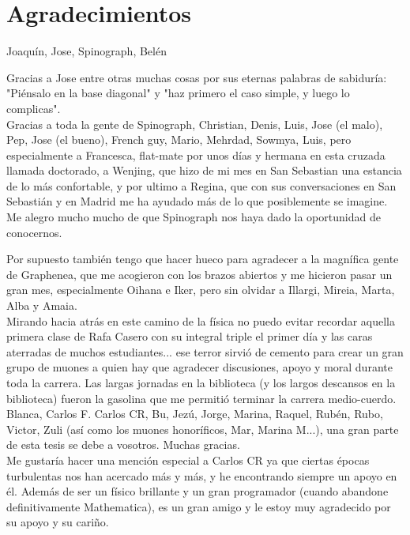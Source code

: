\chapter*{Agradecimientos}
Joaquín, Jose, Spinograph, Belén %


Gracias a Jose entre otras muchas cosas por sus eternas palabras de sabiduría: "Piénsalo en la base diagonal" y "haz primero el caso simple, y luego lo complicas".\\

Gracias a toda la gente de Spinograph, Christian, Denis, Luis, Jose (el malo), Pep, Jose (el bueno), French guy, Mario, Mehrdad, Sowmya, Luis, pero especialmente a Francesca, flat-mate por unos días y hermana en esta cruzada llamada doctorado, a Wenjing, que hizo de mi mes en San Sebastian una estancia de lo más confortable, y por ultimo a Regina, que con sus conversaciones en San Sebastián y en Madrid me ha ayudado más de lo que posiblemente se imagine. Me alegro mucho mucho de que Spinograph nos haya dado la oportunidad de conocernos.

Por supuesto también tengo que hacer hueco para agradecer a la magnífica gente de Graphenea, que me acogieron con los brazos abiertos y me hicieron pasar un gran mes, especialmente Oihana e Iker, pero sin olvidar a Illargi, Mireia, Marta, Alba y Amaia.\\


Mirando hacia atrás en este camino de la física no puedo evitar recordar aquella primera clase de Rafa Casero con su integral triple el primer día y las caras aterradas de muchos estudiantes... ese terror sirvió de cemento para crear un gran grupo de muones a quien hay que agradecer discusiones, apoyo y moral durante toda la carrera.
Las largas jornadas en la biblioteca (y los largos descansos en la biblioteca) fueron la gasolina que me permitió terminar la carrera medio-cuerdo. Blanca, Carlos F. Carlos CR, Bu, Jezú, Jorge, Marina, Raquel, Rubén, Rubo, Victor, Zuli (así como los muones honoríficos, Mar, Marina M...), una gran parte de esta tesis se debe a vosotros. Muchas gracias.\\

Me gustaría hacer una mención especial a Carlos CR ya que ciertas épocas turbulentas nos han acercado más y más, y he encontrando siempre un apoyo en él. Además de ser un físico brillante y un gran programador (cuando abandone definitivamente Mathematica), es un gran amigo y le estoy muy agradecido por su apoyo y su cariño.\\

